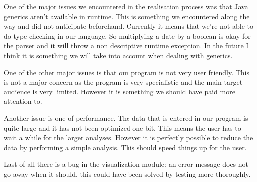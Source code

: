 One of the major issues we encountered in the realisation process was that Java generics aren't available in runtime. This is something we encountered along the way and did not anticipate beforehand. Currently it means that we're not able to do type checking in our language. So multiplying a date by a boolean is okay for the parser and it will throw a non descriptive runtime exception. In the future I think it is something we will take into account when dealing with generics.

One of the other major issues is that our program is not very user friendly. This is not a major concern as the program is very specialistic and the main target audience is very limited. However it is something we should have paid more attention to. 

Another issue is one of performance. The data that is entered in our program is quite large and it  has not been optimized one bit. This means the user has to wait a while for the larger analyses. However it is perfectly possible to reduce the data by performing a simple analysis. This should speed things up for the user.

Last of all there is a bug in the visualization module: an error message does not go away when it should, this could have been solved by testing more thoroughly.